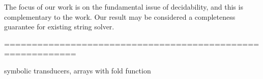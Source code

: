 The focus of our work is on the fundamental issue of decidability, and this is complementary to the work. Our result may be considered a completeness guarantee for existing string solver. 

===========================================================
 
symbolic transducers,   arrays with fold function


%
% 
